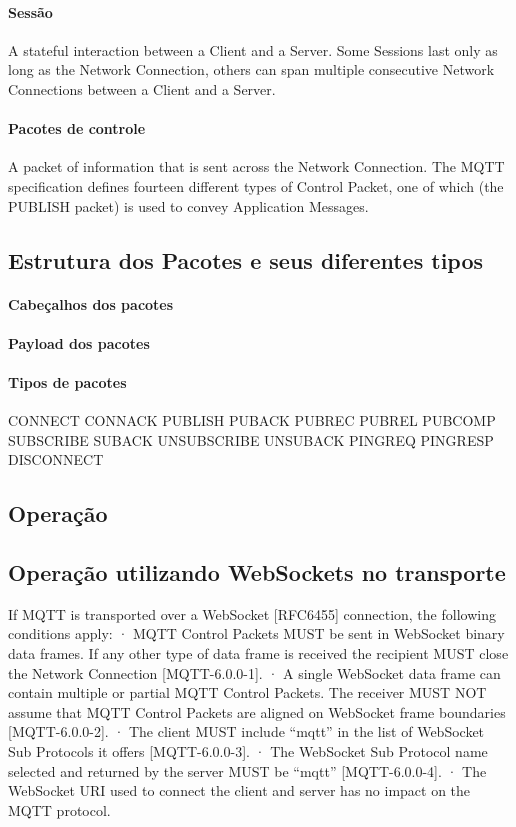 \paragraph{Sessão} 
A stateful interaction between a Client and a Server. Some Sessions last only as long as the Network Connection, others can span multiple consecutive Network Connections between a Client and a Server.

\paragraph{Pacotes de controle} 
A packet of information that is sent across the Network Connection. The MQTT specification defines fourteen different types of Control Packet, one of which (the PUBLISH packet) is used to convey Application Messages.

\subsection{Estrutura dos Pacotes e seus diferentes tipos}

\paragraph{Cabeçalhos dos pacotes}
\paragraph{Payload dos pacotes} 
\paragraph{Tipos de pacotes} 

CONNECT
CONNACK
PUBLISH
PUBACK
PUBREC
PUBREL
PUBCOMP
SUBSCRIBE
SUBACK
UNSUBSCRIBE
UNSUBACK
PINGREQ
PINGRESP
DISCONNECT

\subsection{Operação}


\subsection{Operação utilizando WebSockets no transporte}
If MQTT is transported over a WebSocket [RFC6455] connection, the following conditions apply:
·         MQTT Control Packets MUST be sent in WebSocket binary data frames. If any other type of data frame is received the recipient MUST close the Network Connection [MQTT-6.0.0-1].
·         A single WebSocket data frame can contain multiple or partial MQTT Control Packets. The receiver MUST NOT assume that MQTT Control Packets are aligned on WebSocket frame boundaries [MQTT-6.0.0-2].
·         The client MUST include “mqtt” in the list of WebSocket Sub Protocols it offers [MQTT-6.0.0-3].  
·         The WebSocket Sub Protocol name selected and returned by the server MUST be “mqtt” [MQTT-6.0.0-4].
·         The WebSocket URI used to connect the client and server has no impact on the MQTT protocol.